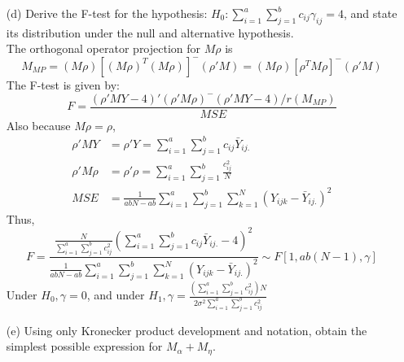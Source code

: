 \begin{itemize}
    \item[(d)] Derive the F-test for the hypothesis: $H_0: \sum_{i=1}^{a}\sum_{j=1}^{b} c_{ij}\gamma_{ij} =4$, and state its distribution under the null and alternative hypothesis.\\
    The orthogonal operator projection for $M\rho$ is\\
    \[ 
    M_{MP} = (M\rho) [(M\rho)^T (M\rho)]^{-} (\rho'M) = (M\rho) [\rho^T M\rho]^{-} (\rho'M)
    \]
     The F-test is given by:\\
    \[ 
    F = \frac{(\rho'MY - 4)' (\rho'M\rho)^{-} (\rho'MY -4)/ r(M_{MP})}{MSE}
    \] 
    Also because $M\rho = \rho$,
 \begin{align*}
    \rho'MY &= \rho'Y = \sum_{i=1}^{a}\sum_{j=1}^{b} c_{ij}\bar{Y}_{ij.}\\
    \rho'M\rho &= \rho'\rho =  \sum_{i=1}^{a}\sum_{j=1}^{b} \frac{c_{ij}^2}{N}\\
    MSE &= \frac{1}{abN - ab} \sum_{i=1}^{a}\sum_{j=1}^{b}\sum_{k=1}^N (Y_{ijk} - \bar{Y}_{ij.})^2
\end{align*}
    Thus,
    \[ 
    F =\frac{\frac{N}{\sum_{i=1}^{a}\sum_{j=1}^{b} c_{ij}^2} (\sum_{i=1}^{a}\sum_{j=1}^{b} c_{ij}\bar{Y}_{ij.} - 4)^2} {\frac{1}{abN - ab} \sum_{i=1}^{a}\sum_{j=1}^{b}\sum_{k=1}^N (Y_{ijk} - \bar{Y}_{ij.})^2} \sim F[1, ab(N-1), \gamma]
    \] 
    Under $H_0, \gamma = 0$, and under $H_1, \gamma = \frac{(\sum_{i=1}^{a}\sum_{j=1}^{b}c_{ij}^2)N}{2\sigma^2 \sum_{i=1}^{a}\sum_{j=1}^{b} c_{ij}^2 }$ 
    
    \item[(e)] Using only Kronecker product development and notation, obtain the simplest possible expression for $M_\alpha + M_\eta$.
    

\end{itemize}
